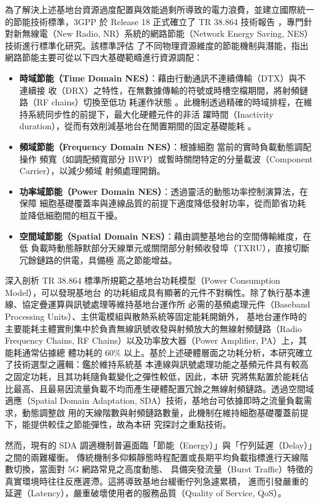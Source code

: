 為了解決上述基地台資源過度配置與效能過剩所導致的電力浪費，並建立國際統一的節能技術標準，3GPP
 於 Release 18 正式確立了 TR 38.864 技術報告 \cite{3gpp2023_tr38864}，專門針對新無線電（New
  Radio, NR）系統的網路節能（Network Energy Saving, NES）技術進行標準化研究。該標準評估
  了不同物理資源維度的節能機制與潛能，指出網路節能主要可從以下四大基礎範疇進行資源調配：
\begin{itemize}
    \item \textbf{時域節能（Time Domain NES）}：藉由行動通訊不連續傳輸（DTX）與不連續接
    收（DRX）之特性，在無數據傳輸的符號或時槽空檔期間，將射頻鏈路（RF chains）切換至低功
    耗運作狀態 。此機制透過精確的時域排程，在維持系統同步性的前提下，最大化硬體元件的非活
    躍時間（Inactivity duration），從而有效削減基地台在閒置期間的固定基礎能耗 。  
    \item \textbf{頻域節能（Frequency Domain NES）}：根據細胞
    當前的實時負載動態調配操作
    頻寬（如調配頻寬部分 BWP）或暫時關閉特定的分量載波（Component Carrier），以減少頻域
    射頻處理開銷。
    \item \textbf{功率域節能（Power Domain NES）}：透過靈活的動態功率控制演算法，在保障
    細胞基礎覆蓋率與連線品質的前提下適度降低發射功率，從而節省功耗並降低細胞間的相互干擾。
    \item \textbf{空間域節能（Spatial Domain NES）}：藉由調整基地台的空間傳輸維度，在低
    負載時動態靜默部分天線單元或關閉部分射頻收發埠（TXRU），直接切斷冗餘鏈路的供電，具備極
    高之節能增益。
\end{itemize}

深入剖析 TR 38.864 標準所規範之基地台功耗模型（Power Consumption Model），可以發現基地台
的功耗組成具有顯著的元件不對稱性。除了執行基本連線、協定疊運算與訊號處理等維持基地台運作所
必需的基頻處理元件（Baseband Processing Units）、主供電模組與散熱系統等固定能耗開銷外，
基地台運作時的主要能耗主體實則集中於負責無線訊號收發與射頻放大的無線射頻鏈路（Radio 
Frequency Chains, RF Chains）以及功率放大器（Power Amplifier, PA）上，其能耗通常佔據總
體功耗的 60\% 以上。基於上述硬體層面之功耗分析，本研究確立了技術選型之邏輯：鑑於維持系統基
本連線與訊號處理功能之基頻元件具有較高之固定功耗，且其功耗隨負載變化之彈性較低，因此，本研
究將焦點置於能耗佔比最高、且最易因流量負載不均而產生硬體配置冗餘之無線射頻鏈路。透過空間域
適應（Spatial Domain Adaptation, SDA）技術，基地台可依據即時之流量負載需求，動態調整啟
用的天線階數與射頻鏈路數量，此機制在維持細胞基礎覆蓋前提下，能提供較佳之節能彈性，故為本研
究探討之重點技術。

然而，現有的 SDA 調適機制普遍面臨「節能（Energy）」與「佇列延遲（Delay）」之間的兩難權衡。
傳統機制多仰賴靜態時程配置或長期平均負載指標進行天線階數切換，當面對 5G 網路常見之高度動態、
具備突發流量（Burst Traffic）特徵的真實環境時往往反應遲滯。這將導致基地台緩衝佇列急遽累積，
進而引發嚴重的延遲（Latency），嚴重破壞使用者的服務品質（Quality of Service, QoS）。

